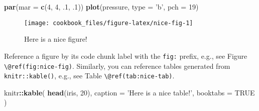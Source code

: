 \documentclass[]{book}
\newenvironment{Shaded}{\begin{snugshade}}{\end{snugshade}}
\newcommand{\DataTypeTok}[1]{\textcolor[rgb]{0.13,0.29,0.53}{#1}}
\newcommand{\DecValTok}[1]{\textcolor[rgb]{0.00,0.00,0.81}{#1}}
\newcommand{\FloatTok}[1]{\textcolor[rgb]{0.00,0.00,0.81}{#1}}
\newcommand{\KeywordTok}[1]{\textcolor[rgb]{0.13,0.29,0.53}{\textbf{#1}}}
\newcommand{\NormalTok}[1]{#1}
\newcommand{\OperatorTok}[1]{\textcolor[rgb]{0.81,0.36,0.00}{\textbf{#1}}}
\newcommand{\OtherTok}[1]{\textcolor[rgb]{0.56,0.35,0.01}{#1}}
\newcommand{\StringTok}[1]{\textcolor[rgb]{0.31,0.60,0.02}{#1}}
\begin{document}
\begin{Shaded}
\begin{Highlighting}[]
\KeywordTok{par}\NormalTok{(}\DataTypeTok{mar =} \KeywordTok{c}\NormalTok{(}\DecValTok{4}\NormalTok{, }\DecValTok{4}\NormalTok{, }\FloatTok{.1}\NormalTok{, }\FloatTok{.1}\NormalTok{))}
\KeywordTok{plot}\NormalTok{(pressure, }\DataTypeTok{type =} \StringTok{'b'}\NormalTok{, }\DataTypeTok{pch =} \DecValTok{19}\NormalTok{)}
\end{Highlighting}
\end{Shaded}

\begin{figure}

{\centering \texttt{[image: cookbook\_files/figure-latex/nice-fig-1]} 

}

\caption{Here is a nice figure!}\label{fig:nice-fig}
\end{figure}

Reference a figure by its code chunk label with the \texttt{fig:} prefix, e.g., see Figure \texttt{\textbackslash{}@ref(fig:nice-fig)}. Similarly, you can reference tables generated from \texttt{knitr::kable()}, e.g., see Table \texttt{\textbackslash{}@ref(tab:nice-tab)}.

\begin{Shaded}
\begin{Highlighting}[]
\NormalTok{knitr}\OperatorTok{::}\KeywordTok{kable}\NormalTok{(}
  \KeywordTok{head}\NormalTok{(iris, }\DecValTok{20}\NormalTok{), }\DataTypeTok{caption =} \StringTok{'Here is a nice table!'}\NormalTok{,}
  \DataTypeTok{booktabs =} \OtherTok{TRUE}
\NormalTok{)}
\end{Highlighting}
\end{Shaded}
\end{document}
